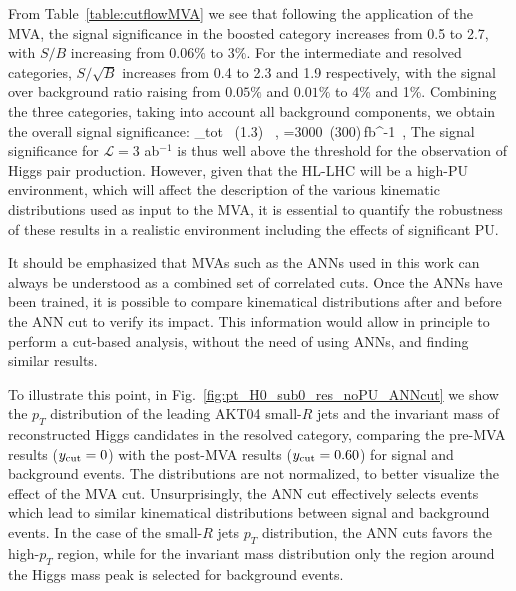 From Table~\ref{table:cutflowMVA} we see that
following the application of the MVA, 
the signal significance in the boosted category increases
from 0.5 to 2.7, with $S/B$ increasing from $0.06\%$ to $3\%$.
%
For the intermediate and resolved categories, $S/\sqrt{B}$
increases from 0.4 to 2.3 and 1.9 respectively, with
the signal over background ratio raising from
$0.05\%$ and $0.01\%$ to 4\% and 1\%.
%
Combining the three categories, taking into
account all background components, we obtain the overall signal
significance:
\be
\lp {}\rp_{\rm tot} ~(1.3) \, ,\quad
{}=3000~(300)\,{\rm fb}^{-1}\, ,
\ee
%
The signal significance for
$\mathcal{L}=3$ ab$^{-1}$
is thus
well above the threshold for the observation of Higgs
pair production.
%
However, given that the HL-LHC will be a high-PU environment,
which will affect the description of the various
kinematic distributions used as input to the MVA,
it is essential to quantify the robustness of these
results
in a realistic environment including the effects of
significant PU.



It should be emphasized that MVAs such as the ANNs used in this work can always be understood as
a combined set of correlated cuts.
%
Once the ANNs have been trained, it is possible to compare  kinematical distributions after and before the ANN  cut to verify its impact.
%
This information would allow in principle to perform a cut-based analysis, without the need of using ANNs,
and finding similar results.


To illustrate this point,
in Fig.~\ref{fig:pt_H0_sub0_res_noPU_ANNcut} we show
the $p_T$ distribution of the leading AKT04 small-$R$ jets
and the invariant mass of reconstructed Higgs candidates in the resolved
  category, comparing the pre-MVA results ($y_{\rm cut}=0$) with the post-MVA
  results ($y_{\rm cut}=0.60$) for signal and background  events.
  The distributions are not normalized, to better visualize the effect
  of the MVA cut.
  Unsurprisingly, the ANN cut effectively selects events which
  lead to similar kinematical distributions between signal
  and background events.
  In the case of the small-$R$ jets $p_T$ distribution, the
  ANN cuts favors the
  high-$p_T$ region, while for the invariant mass distribution
  only the region around the Higgs mass peak is selected for
  background events.


